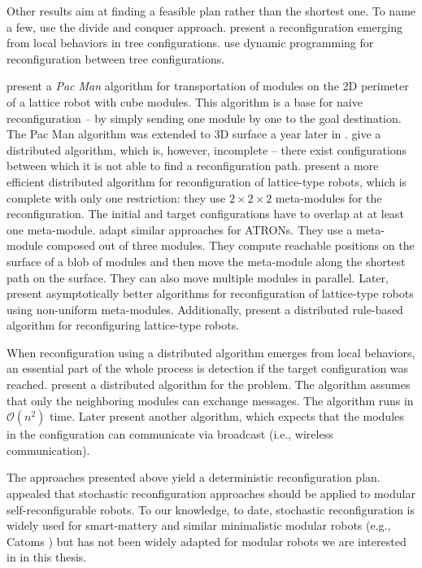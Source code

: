 Other results aim at finding a feasible plan rather than the shortest one. To
name a few, \textcite{10.1117/12.360345} use the divide and conquer approach.
\textcite{DBLP:conf/icra/HouS08} present a reconfiguration emerging from local
behaviors in tree configurations. \textcite{DBLP:journals/ral/LiuWY19} use
dynamic programming for reconfiguration between tree configurations.

\textcite{DBLP:conf/iros/ButlerBR01} present a \emph{Pac Man} algorithm for
transportation of modules on the 2D perimeter of a lattice robot with cube
modules. This algorithm is a base for naive reconfiguration -- by simply sending
one module by one to the goal destination. The Pac Man algorithm was extended to
3D surface a year later in \cite{DBLP:conf/wafr/ButlerR02}.
\textcite{DBLP:journals/dc/WalterWA00} give a distributed algorithm, which is,
however, incomplete -- there exist configurations between which it is not able
to find a reconfiguration path. \textcite{DBLP:conf/icra/VassilvitskiiYS02}
present a more efficient distributed algorithm for reconfiguration of
lattice-type robots, which is complete with only one restriction: they use
$2\times2\times2$ meta-modules for the reconfiguration. The initial and target
configurations have to overlap at at least one meta-module.
\textcite{DBLP:conf/ieeealife/Christensen07} adapt similar approaches for
ATRONs. They use a meta-module composed out of three modules. They compute
reachable positions on the surface of a blob of modules and then move the
meta-module along the shortest path on the surface. They can also move multiple
modules in parallel. Later, \textcite{DBLP:journals/comgeo/AloupisBDDFIW13}
present asymptotically better algorithms for reconfiguration of lattice-type
robots using non-uniform meta-modules. Additionally,
\textcite{DBLP:conf/pdp/PirandaB16} present a distributed rule-based algorithm
for reconfiguring lattice-type robots.

When reconfiguration using a distributed algorithm emerges from local behaviors,
an essential part of the whole process is detection if the target configuration
was reached. \textcite{DBLP:conf/icra/ButlerFRW02} present a distributed
algorithm for the problem. The algorithm assumes that only the neighboring
modules can exchange messages. The algorithm runs in $\mathcal{O}(n^2)$ time.
Later \textcite{DBLP:journals/ras/BacaWDN17} present another algorithm, which
expects that the modules in the configuration can communicate via broadcast
(i.e., wireless communication).

The approaches presented above yield a deterministic reconfiguration plan.
\textcite{4141032} appealed that stochastic reconfiguration approaches should be
applied to modular self-reconfigurable robots. To our knowledge, to date,
stochastic reconfiguration is widely used for smart-mattery and similar
minimalistic modular robots (e.g., Catoms \cite{DBLP:conf/aaai/KirbyCAPHMG05})
but has not been widely adapted for  modular robots we are
interested in in this thesis.

